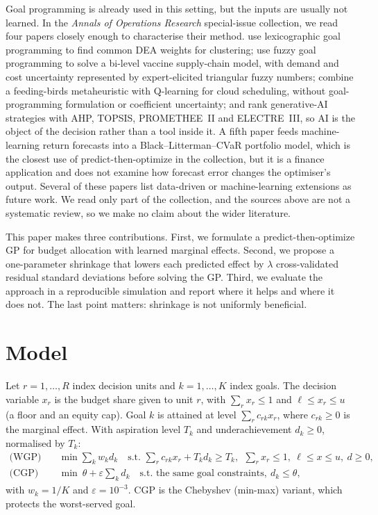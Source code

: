 \documentclass[11pt,a4paper]{article}
\begin{document}
Goal programming is already used in this setting, but the inputs are usually not learned. In the \emph{Annals of Operations Research} special-issue collection, we read four papers closely enough to characterise their method. \citet{omrani2026} use lexicographic goal programming to find common DEA weights for clustering; \citet{hosseini2026} use fuzzy goal programming to solve a bi-level vaccine supply-chain model, with demand and cost uncertainty represented by expert-elicited triangular fuzzy numbers; \citet{qi2025} combine a feeding-birds metaheuristic with Q-learning for cloud scheduling, without goal-programming formulation or coefficient uncertainty; and \citet{zeqiri2026} rank generative-AI strategies with AHP, TOPSIS, PROMETHEE~II and ELECTRE~III, so AI is the object of the decision rather than a tool inside it. A fifth paper \citep{truyols2026} feeds machine-learning return forecasts into a Black--Litterman--CVaR portfolio model, which is the closest use of predict-then-optimize in the collection, but it is a finance application and does not examine how forecast error changes the optimiser's output. Several of these papers list data-driven or machine-learning extensions as future work. We read only part of the collection, and the sources above are not a systematic review, so we make no claim about the wider literature.

This paper makes three contributions. First, we formulate a predict-then-optimize GP for budget allocation with learned marginal effects. Second, we propose a one-parameter shrinkage that lowers each predicted effect by $\lambda$ cross-validated residual standard deviations before solving the GP. Third, we evaluate the approach in a reproducible simulation and report where it helps and where it does not. The last point matters: shrinkage is not uniformly beneficial.

\section{Model}
Let $r=1,\dots,R$ index decision units and $k=1,\dots,K$ index goals. The decision variable $x_r$ is the budget share given to unit $r$, with $\sum_r x_r\le 1$ and $\ell\le x_r\le u$ (a floor and an equity cap). Goal $k$ is attained at level $\sum_r c_{rk}x_r$, where $c_{rk}\ge 0$ is the marginal effect. With aspiration level $T_k$ and underachievement $d_k\ge 0$, normalised by $T_k$:
\begin{align}
\text{(WGP)}\quad &\min \sum_k w_k d_k \quad \text{s.t. } \sum_r c_{rk}x_r + T_k d_k \ge T_k,\ \ \textstyle\sum_r x_r\le 1,\ \ell\le x\le u,\ d\ge0,\\
\text{(CGP)}\quad &\min\ \theta+\varepsilon\sum_k d_k \quad \text{s.t. the same goal constraints},\ d_k\le\theta,
\end{align}
with $w_k=1/K$ and $\varepsilon=10^{-3}$. CGP is the Chebyshev (min-max) variant, which protects the worst-served goal.
\end{document}
